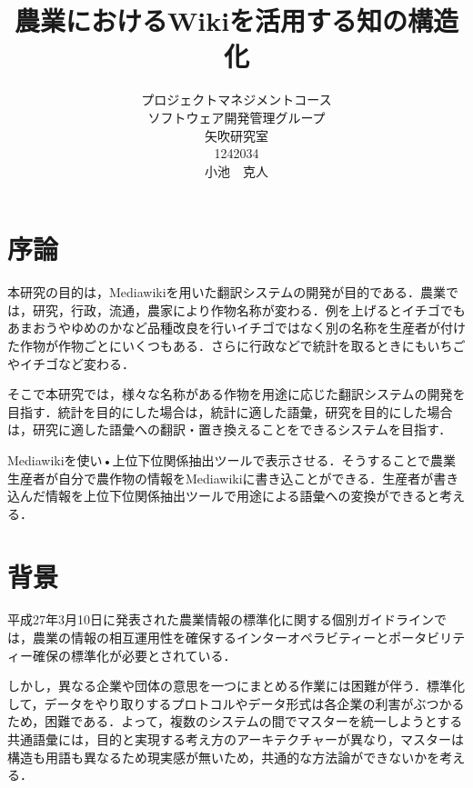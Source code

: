 \title{農業におけるWikiを活用する知の構造化}
\author{プロジェクトマネジメントコース\\
ソフトウェア開発管理グループ\\
矢吹研究室\\
1242034\\
小池　克人}
\date{}

\maketitle





\frontmatter
\tableofcontents
 \mainmatter
 \chapter{序論}
本研究の目的は，Mediawikiを用いた翻訳システムの開発が目的である．農業では，研究，行政，流通，農家により作物名称が変わる．例を上げるとイチゴでもあまおうやゆめのかなど品種改良を行いイチゴではなく別の名称を生産者が付けた作物が作物ごとにいくつもある．さらに行政などで統計を取るときにもいちごやイチゴなど変わる．

そこで本研究では，様々な名称がある作物を用途に応じた翻訳システムの開発を目指す．統計を目的にした場合は，統計に適した語彙，研究を目的にした場合は，研究に適した語彙への翻訳・置き換えることをできるシステムを目指す．

Mediawikiを使い•上位下位関係抽出ツールで表示させる．そうすることで農業生産者が自分で農作物の情報をMediawikiに書き込ことができる．生産者が書き込んだ情報を上位下位関係抽出ツールで用途による語彙への変換ができると考える．




 \chapter{背景}
平成27年3月10日に発表された農業情報の標準化に関する個別ガイドラインでは，農業の情報の相互運用性を確保するインターオペラビティーとポータビリティー確保の標準化が必要とされている\cite{naikaku2014}．

しかし，異なる企業や団体の意思を一つにまとめる作業には困難が伴う．標準化して，データをやり取りするプロトコルやデータ形式は各企業の利害がぶつかるため，困難である\cite{kizi2015}．よって，複数のシステムの間でマスターを統一しようとする共通語彙には，目的と実現する考え方のアーキテクチャーが異なり，マスターは構造も用語も異なるため現実感が無いため，共通的な方法論ができないかを考える．

